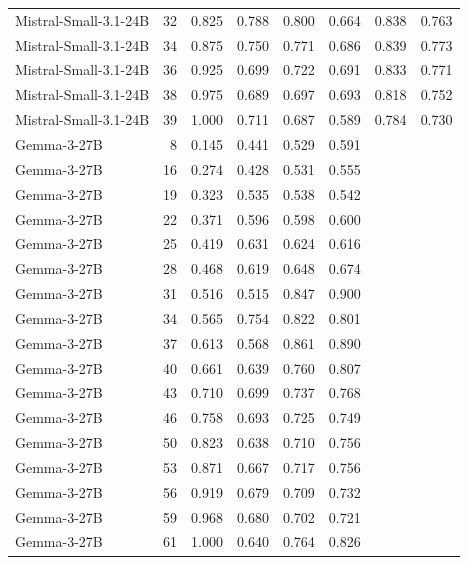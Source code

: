 \begin{table}
\begin{tabular}{lrrrrrrr}
Mistral-Small-3.1-24B & 32 & 0.825 & 0.788 & 0.800 & 0.664 & 0.838 & 0.763 \\
Mistral-Small-3.1-24B & 34 & 0.875 & 0.750 & 0.771 & 0.686 & 0.839 & 0.773 \\
Mistral-Small-3.1-24B & 36 & 0.925 & 0.699 & 0.722 & 0.691 & 0.833 & 0.771 \\
Mistral-Small-3.1-24B & 38 & 0.975 & 0.689 & 0.697 & 0.693 & 0.818 & 0.752 \\
Mistral-Small-3.1-24B & 39 & 1.000 & 0.711 & 0.687 & 0.589 & 0.784 & 0.730 \\
Gemma-3-27B & 8 & 0.145 & 0.441 & 0.529 & 0.591 &  &  \\
Gemma-3-27B & 16 & 0.274 & 0.428 & 0.531 & 0.555 &  &  \\
Gemma-3-27B & 19 & 0.323 & 0.535 & 0.538 & 0.542 &  &  \\
Gemma-3-27B & 22 & 0.371 & 0.596 & 0.598 & 0.600 &  &  \\
Gemma-3-27B & 25 & 0.419 & 0.631 & 0.624 & 0.616 &  &  \\
Gemma-3-27B & 28 & 0.468 & 0.619 & 0.648 & 0.674 &  &  \\
Gemma-3-27B & 31 & 0.516 & 0.515 & 0.847 & 0.900 &  &  \\
Gemma-3-27B & 34 & 0.565 & 0.754 & 0.822 & 0.801 &  &  \\
Gemma-3-27B & 37 & 0.613 & 0.568 & 0.861 & 0.890 &  &  \\
Gemma-3-27B & 40 & 0.661 & 0.639 & 0.760 & 0.807 &  &  \\
Gemma-3-27B & 43 & 0.710 & 0.699 & 0.737 & 0.768 &  &  \\
Gemma-3-27B & 46 & 0.758 & 0.693 & 0.725 & 0.749 &  &  \\
Gemma-3-27B & 50 & 0.823 & 0.638 & 0.710 & 0.756 &  &  \\
Gemma-3-27B & 53 & 0.871 & 0.667 & 0.717 & 0.756 &  &  \\
Gemma-3-27B & 56 & 0.919 & 0.679 & 0.709 & 0.732 &  &  \\
Gemma-3-27B & 59 & 0.968 & 0.680 & 0.702 & 0.721 &  &  \\
Gemma-3-27B & 61 & 1.000 & 0.640 & 0.764 & 0.826 &  &  \\
\bottomrule
\end{tabular}
\end{table}
